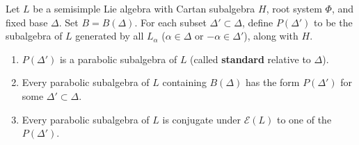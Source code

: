 Let $L$ be a semisimple Lie algebra with Cartan subalgebra $H$, root system $\Phi$, and fixed base $\Delta$. Set $B = B(\Delta)$. For each subset $\Delta' \subset \Delta$, define $P(\Delta')$ to be the subalgebra of $L$ generated by all $L_\alpha$ ($\alpha \in \Delta$ or $-\alpha \in \Delta'$), along with $H$.

\begin{enumerate}
  \item[(a)] $P(\Delta')$ is a parabolic subalgebra of $L$ (called \textbf{standard} relative to $\Delta$).
  \item[(b)] Every parabolic subalgebra of $L$ containing $B(\Delta)$ has the form $P(\Delta')$ for some $\Delta' \subset \Delta$.
  \item[(c)] Every parabolic subalgebra of $L$ is conjugate under $\mathcal{E}(L)$ to one of the $P(\Delta')$.
\end{enumerate}
